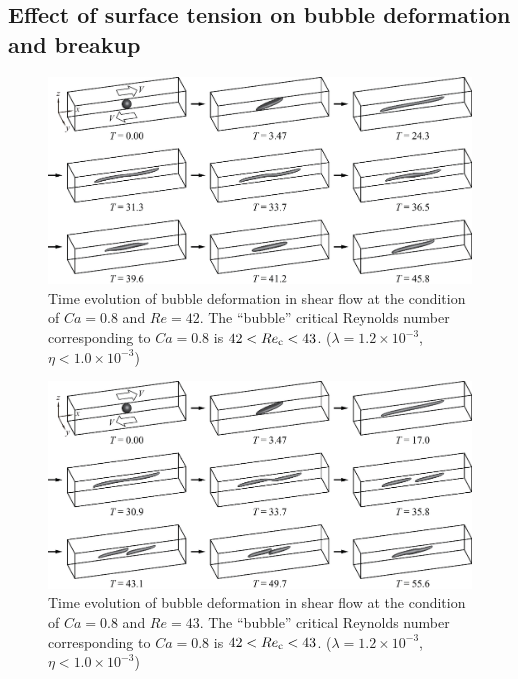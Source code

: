 \documentclass[review]{elsarticle}
\begin{document}
\subsection{Effect of surface tension on bubble deformation and breakup}
%
\begin{figure}%
  \centering
  \includegraphics[width=\textwidth]{10-BubbleDeformCa0p8Re42}
  \caption{Time evolution of bubble deformation in shear flow at the 
           condition of $Ca=0.8$ and $Re=42$.
	   The ``bubble'' 
	   critical Reynolds number corresponding to $Ca=0.8$ is
	   $42<Re_{\rm c}<43$.
           ($\lambda = 1.2 \times 10^{-3}$, $\eta < 1.0 \times 10^{-3}$) 
	   }
  \label{fig:BubDefCa0p8Re42}
\end{figure}
%
\begin{figure}%
  \centering
  \includegraphics[width=\textwidth]{11-BubbleBreakCa0p8Re43}
  \caption{Time evolution of bubble deformation in shear flow at the 
           condition of $Ca=0.8$ and $Re=43$.
	   The ``bubble'' 
	   critical Reynolds number corresponding to $Ca=0.8$ is
	   $42<Re_{\rm c}<43$.
           ($\lambda = 1.2 \times 10^{-3}$, $\eta < 1.0 \times 10^{-3}$) 
	   }
  \label{fig:BubBrkCa0p8Re43}
\end{figure}
\end{document}
